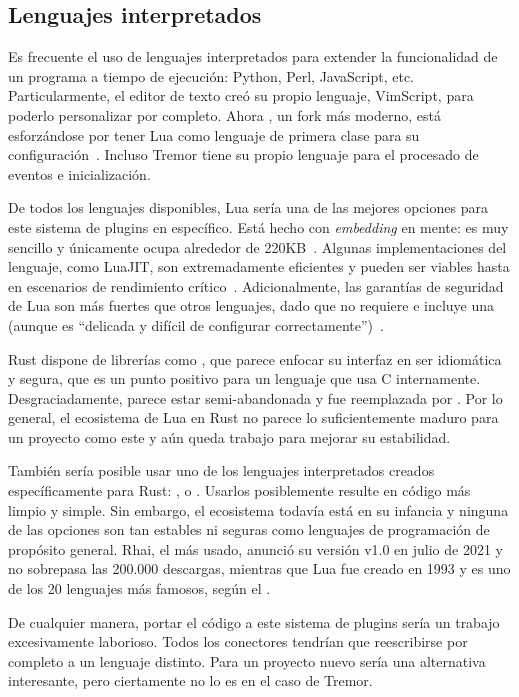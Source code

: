 \subsection{Lenguajes interpretados}

Es frecuente el uso de lenguajes interpretados para extender la funcionalidad de
un programa a tiempo de ejecución: Python, Perl, JavaScript, etc.
Particularmente, el editor de texto  creó su propio lenguaje,
VimScript, para poderlo personalizar por completo. Ahora , un
fork más moderno, está esforzándose por tener Lua como lenguaje de primera clase
para su configuración~\cite{nvimlua}. Incluso Tremor tiene su propio lenguaje
para el procesado de eventos e inicialización.

De todos los lenguajes disponibles, Lua sería una de las mejores opciones para
este sistema de plugins en específico. Está hecho con \emph{embedding} en mente:
es muy sencillo y únicamente ocupa alrededor de
220KB~\cite{ierusalimschy2006programming}. Algunas implementaciones del
lenguaje, como LuaJIT, son extremadamente eficientes y pueden ser viables hasta
en escenarios de rendimiento crítico~\cite{luajitperf}. Adicionalmente, las
garantías de seguridad de Lua son más fuertes que otros lenguajes, dado que no
requiere \unsafe e incluye una \sandbox (aunque es ``delicada y difícil de
configurar correctamente'')~\cite{luasandboxes}.

Rust dispone de librerías como , que parece enfocar su interfaz
en ser idiomática y segura, que es un punto positivo para un lenguaje que usa C
internamente. Desgraciadamente, parece estar semi-abandonada y fue reemplazada
por . Por lo general, el ecosistema de Lua en Rust no parece lo
suficientemente maduro para un proyecto como este y aún queda trabajo para
mejorar su estabilidad.

También sería posible usar uno de los lenguajes interpretados creados
específicamente para Rust: ,  o .
Usarlos posiblemente resulte en código más limpio y simple. Sin embargo, el
ecosistema todavía está en su infancia y ninguna de las opciones son tan
estables ni seguras como lenguajes de programación de propósito general. Rhai,
el más usado, anunció su versión v1.0 en julio de 2021 y no sobrepasa las
200.000 descargas, mientras que Lua fue creado en 1993 y es uno de los 20
lenguajes más famosos, según el .

De cualquier manera, portar el código a este sistema de plugins sería un trabajo
excesivamente laborioso. Todos los conectores tendrían que reescribirse por
completo a un lenguaje distinto. Para un proyecto nuevo sería una alternativa
interesante, pero ciertamente no lo es en el caso de Tremor.

